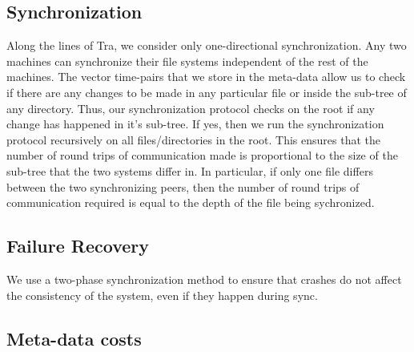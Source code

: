 \subsection{Synchronization}
Along the lines of Tra, we consider only one-directional synchronization. Any two machines can synchronize their file systems independent of the rest of the machines. The vector time-pairs that we store in the meta-data allow us to check if there are any changes to be made in any particular file or inside the sub-tree of any directory. Thus, our synchronization protocol checks on the root if any change has happened in it's sub-tree. If yes, then we run the synchronization protocol recursively on all files/directories in the root. This ensures that the number of round trips of communication made is proportional to the size of the sub-tree that the two systems differ in. In particular, if only one file differs between the two synchronizing peers, then the number of round trips of communication required is equal to the depth of the file being sychronized.

\subsection{Failure Recovery} \label{subsec:failure}
We use a two-phase synchronization method to ensure that crashes do not affect the consistency of the system, even if they happen during sync.

\subsection{Meta-data costs}
